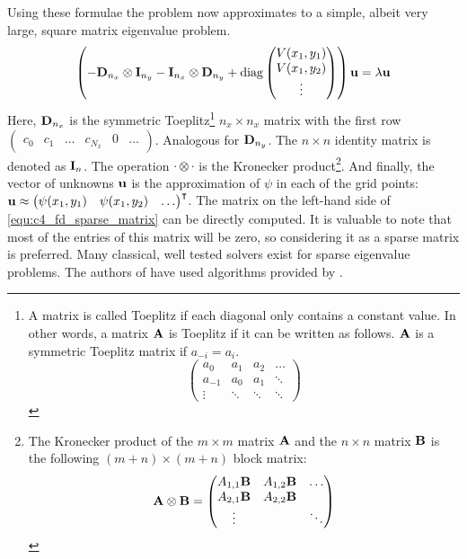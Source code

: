 Using these formulae the problem now approximates to a simple, albeit very large, square matrix eigenvalue problem.
\begin{equation}\label{equ:c4_fd_sparse_matrix}
    \left(-\vb{D}_{n_x} \otimes \vb{I}_{n_y} - \vb{I}_{n_x} \otimes \vb{D}_{n_y} +  \operatorname{diag}\begin{pmatrix}V(x_1, y_1) \\ V(x_1, y_2) \\ \vdots \end{pmatrix} \right)\vb{u} = \lambda \vb{u}
\end{equation}
Here, $\vb{D}_{n_x}$ is the symmetric Toeplitz\footnote{A matrix is called Toeplitz if each diagonal only contains a constant value. In other words, a matrix $\vb{A}$ is Toeplitz if it can be written as follows. $\vb{A}$ is a symmetric Toeplitz matrix if $a_{-i} = a_i$. $$\begin{pmatrix} a_0 & a_1 & a_2 & \dots \\ a_{-1} & a_0 & a_1 & \ddots \\ \vdots & \ddots & \ddots & \ddots \end{pmatrix}$$} $n_x \times n_x$ matrix with the first row $\begin{pmatrix} c_0 & c_1 & \dots & c_{N_x} & 0 & \dots \end{pmatrix}$. Analogous for $\vb{D}_{n_y}$. The $n\times n$ identity matrix is denoted as $\vb{I}_n$. The operation $\cdot \otimes \cdot$ is the Kronecker product\footnote{The Kronecker product of the $m\times m$ matrix $\vb{A}$ and the $n\times n$ matrix $\vb{B}$ is the following $(m+n)\times (m+n)$ block matrix: $$ \vb{A} \otimes \vb{B} = \begin{pmatrix} A_{1,1} \vb{B} & A_{1,2} \vb{B} & \dots \\ A_{2,1} \vb{B} & A_{2,2} \vb{B} & \\ \vdots & & \ddots \end{pmatrix} $$}. And finally, the vector of unknowns $\vb{u}$ is the approximation of $\psi$ in each of the grid points: $\vb{u} \approx {\begin{pmatrix} \psi(x_1, y_1) & \psi(x_1, y_2) & \dots \end{pmatrix}}^\intercal$. The matrix on the left-hand side of \eqref{equ:c4_fd_sparse_matrix} can be directly computed. It is valuable to note that most of the entries of this matrix will be zero, so considering it as a sparse matrix is preferred. Many classical, well tested solvers exist for sparse eigenvalue problems. The authors of \cite{wang_new_2009} have used algorithms provided by \mathematica\cite{Mathematica}.

